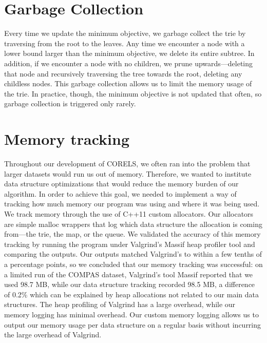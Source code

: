 \section{Garbage Collection}
Every time we update the minimum objective, we garbage collect the trie by traversing from the root to the leaves.
Any time we encounter a node with a lower bound larger than the minimum objective, we delete its entire subtree.
In addition, if we encounter a node with no children, we prune upwards---deleting that node and recursively traversing the tree towards the root, deleting any childless nodes.
This garbage collection allows us to limit the memory usage of the trie.
In practice, though, the minimum objective is not updated that often, so garbage collection is triggered only rarely.

\section{Memory tracking}
Throughout our development of CORELS, we often ran into the problem that larger datasets would run us out of memory.
Therefore, we wanted to institute data structure optimizations that would reduce the memory burden of our algorithm.
In order to achieve this goal, we needed to implement a way of tracking how much memory our program was using and where it was being used.
We track memory through the use of C++11 custom allocators.
Our allocators are simple malloc wrappers that log which data structure the allocation is coming from---the trie, the map, or the queue.
We validated the accuracy of this memory tracking by running the program under Valgrind's Massif heap profiler tool and comparing the outputs.
Our outputs matched Valgrind's to within a few tenths of a percentage points, so we concluded that our memory tracking was successful: on a limited run of the COMPAS dataset, Valgrind's tool Massif reported that we used 98.7 MB, while our data structure tracking recorded 98.5 MB, a difference of 0.2\% which can be explained by heap allocations not related to our main data structures.
The heap profiling of Valgrind has a large overhead, while our memory logging has minimal overhead.
Our custom memory logging allows us to output our memory usage per data structure on a regular basis without incurring the large overhead of Valgrind.